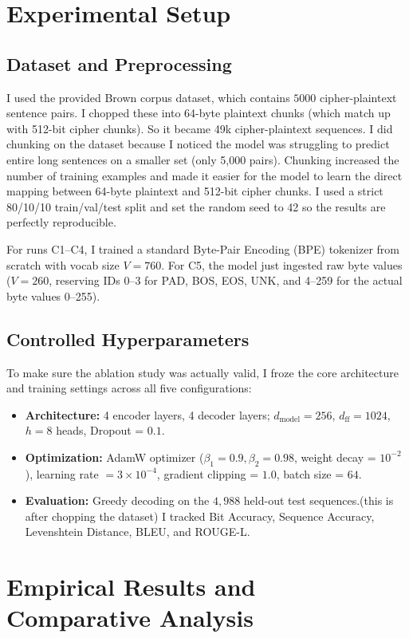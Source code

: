 \documentclass[12pt,a4paper]{article}
\begin{document}
\section{Experimental Setup}

\subsection{Dataset and Preprocessing}
I used the provided Brown corpus dataset, which contains $5000$ cipher-plaintext sentence pairs. I chopped these into 64-byte plaintext chunks (which match up with 512-bit cipher chunks). So it became 49k cipher-plaintext sequences. I did chunking on the dataset because I noticed the model was struggling to predict entire long sentences on a smaller set (only 5,000 pairs). Chunking increased the number of training examples and made it easier for the model to learn the direct mapping between 64-byte plaintext and 512-bit cipher chunks.
I used a strict 80/10/10 train/val/test split and set the random seed to 42 so the results are perfectly reproducible.

For runs C1--C4, I trained a standard Byte-Pair Encoding (BPE) tokenizer from scratch with vocab size $V=760$. For C5, the model just ingested raw byte values ($V=260$, reserving IDs 0--3 for PAD, BOS, EOS, UNK, and 4--259 for the actual byte values 0--255).

\subsection{Controlled Hyperparameters}
To make sure the ablation study was actually valid, I froze the core architecture and training settings across all five configurations:
\begin{itemize}
    \item \textbf{Architecture:} 4 encoder layers, 4 decoder layers; $d_{\text{model}} = 256$, $d_{\text{ff}} = 1024$, $h = 8$ heads, Dropout = $0.1$.
    \item \textbf{Optimization:} AdamW optimizer ($\beta_1 = 0.9, \beta_2 = 0.98$, weight decay = $10^{-2}$), learning rate $= 3 \times 10^{-4}$, gradient clipping = $1.0$, batch size = $64$.
    \item \textbf{Evaluation:} Greedy decoding on the $4,988$ held-out test sequences.(this is after chopping the dataset) I tracked Bit Accuracy, Sequence Accuracy, Levenshtein Distance, BLEU, and ROUGE-L.
\end{itemize}

\section{Empirical Results and Comparative Analysis}
\end{document}
